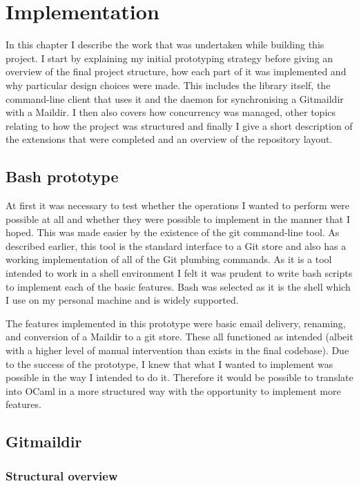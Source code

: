 \chapter{Implementation}

In this chapter I describe the work that was undertaken while building this project. I start by explaining my initial prototyping strategy before giving an overview of the final project structure, how each part of it was implemented and why particular design choices were made. This includes the library itself, the command-line client that uses it and the daemon for synchronising a Gitmaildir with a Maildir. I then also covers how concurrency was managed, other topics relating to how the project was structured and finally I give a short description of the extensions that were completed and an overview of the repository layout.

\section{Bash prototype}

At first it was necessary to test whether the operations I wanted to perform were possible at all and whether they were possible to implement in the manner that I hoped. This was made easier by the existence of the git command-line tool. As described earlier, this tool is the standard interface to a Git store and also has a working implementation of all of the Git plumbing commands. As it is a tool intended to work in a shell environment I felt it was prudent to write bash scripts to implement each of the basic features. Bash was selected as it is the shell which I use on my personal machine and is widely supported.

The features implemented in this prototype were basic email delivery, renaming, and conversion of a Maildir to a git store. These all functioned as intended (albeit with a higher level of manual intervention than exists in the final codebase). Due to the success of the prototype, I knew that what I wanted to implement was possible in the way I intended to do it. Therefore it would be possible to translate into OCaml in a more structured way with the opportunity to implement more features.

\section{Gitmaildir}

\subsection{Structural overview} \label{section:structuraloverview}

